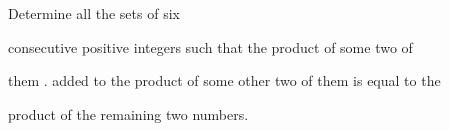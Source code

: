 Determine all the sets of six 

consecutive positive integers such that the product of some two  of  

them . added to the product of some other two  of  them is equal to the 

product of the remaining two numbers.